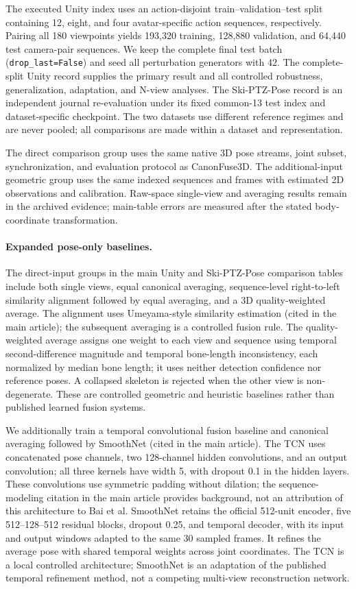 \documentclass[11pt,letterpaper]{article}
\begin{document}
The executed Unity index uses an action-disjoint train--validation--test split containing 12, eight, and four avatar-specific action sequences, respectively. Pairing all 180 viewpoints yields 193,320 training, 128,880 validation, and 64,440 test camera-pair sequences. We keep the complete final test batch (\texttt{drop\_last=False}) and seed all perturbation generators with 42. The complete-split Unity record supplies the primary result and all controlled robustness, generalization, adaptation, and N-view analyses. The Ski-PTZ-Pose record is an independent journal re-evaluation under its fixed common-13 test index and dataset-specific checkpoint. The two datasets use different reference regimes and are never pooled; all comparisons are made within a dataset and representation.


The direct comparison group uses the same native 3D pose streams, joint subset, synchronization, and evaluation protocol as CanonFuse3D. The additional-input geometric group uses the same indexed sequences and frames with estimated 2D observations and calibration. Raw-space single-view and averaging results remain in the archived evidence; main-table errors are measured after the stated body-coordinate transformation.

\paragraph{Expanded pose-only baselines.}
The direct-input groups in the main Unity and Ski-PTZ-Pose comparison tables include both single views, equal canonical averaging, sequence-level right-to-left similarity alignment followed by equal averaging, and a 3D quality-weighted average. The alignment uses Umeyama-style similarity estimation (cited in the main article); the subsequent averaging is a controlled fusion rule. The quality-weighted average assigns one weight to each view and sequence using temporal second-difference magnitude and temporal bone-length inconsistency, each normalized by median bone length; it uses neither detection confidence nor reference poses. A collapsed skeleton is rejected when the other view is non-degenerate. These are controlled geometric and heuristic baselines rather than published learned fusion systems.

We additionally train a temporal convolutional fusion baseline and canonical averaging followed by SmoothNet (cited in the main article). The TCN uses concatenated pose channels, two 128-channel hidden convolutions, and an output convolution; all three kernels have width 5, with dropout 0.1 in the hidden layers. These convolutions use symmetric padding without dilation; the sequence-modeling citation in the main article provides background, not an attribution of this architecture to Bai et al. SmoothNet retains the official 512-unit encoder, five 512--128--512 residual blocks, dropout 0.25, and temporal decoder, with its input and output windows adapted to the same 30 sampled frames. It refines the average pose with shared temporal weights across joint coordinates. The TCN is a local controlled architecture; SmoothNet is an adaptation of the published temporal refinement method, not a competing multi-view reconstruction network.
\end{document}
